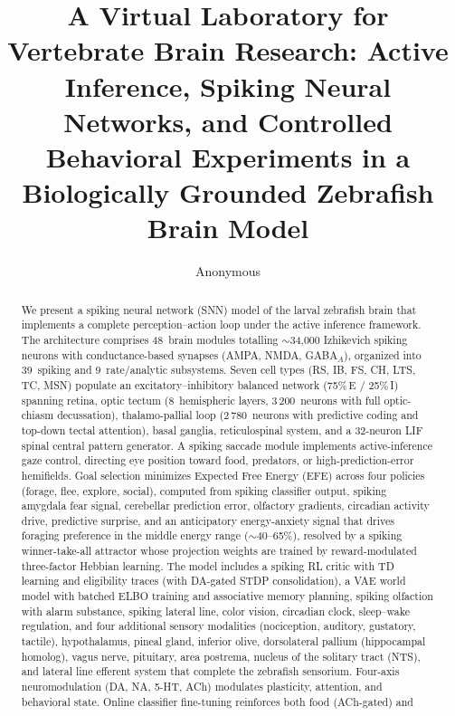\documentclass[12pt]{article}
\title{A Virtual Laboratory for Vertebrate Brain Research: Active Inference,
Spiking Neural Networks, and Controlled Behavioral Experiments in a
Biologically Grounded Zebrafish Brain Model}
\author{Anonymous}
\date{}
\begin{document}
\maketitle

\begin{abstract}
We present a spiking neural network (SNN) model of the larval zebrafish
brain that implements a complete perception--action loop under the
active inference framework.
The architecture comprises 48~brain modules totalling $\sim$34,000 Izhikevich
spiking neurons with conductance-based synapses (AMPA, NMDA, GABA$_A$),
organized into 39~spiking and 9~rate/analytic subsystems.
Seven cell types (RS, IB, FS, CH, LTS, TC, MSN) populate an
excitatory--inhibitory balanced network (75\%\,E / 25\%\,I) spanning
retina, optic tectum (8~hemispheric layers, 3\,200~neurons with full
optic-chiasm decussation), thalamo-pallial loop
(2\,780~neurons with predictive coding and top-down tectal attention),
basal ganglia, reticulospinal system, and a 32-neuron LIF spinal central
pattern generator.
A spiking saccade module implements active-inference gaze control,
directing eye position toward food, predators, or high-prediction-error
hemifields.
Goal selection minimizes Expected Free Energy (EFE) across four
policies (forage, flee, explore, social), computed from spiking
classifier output, spiking amygdala fear signal, cerebellar prediction
error, olfactory gradients, circadian activity drive, predictive
surprise, and an anticipatory energy-anxiety signal that drives
foraging preference in the middle energy range ($\sim$40--65\%),
resolved by a spiking winner-take-all attractor whose
projection weights are trained by reward-modulated three-factor
Hebbian learning.
The model includes a spiking RL critic with TD learning and
eligibility traces (with DA-gated STDP consolidation), a VAE world
model with batched ELBO training and associative memory planning,
spiking olfaction with alarm substance, spiking lateral line, color
vision, circadian clock, sleep--wake regulation, and four additional
sensory modalities (nociception, auditory, gustatory, tactile),
hypothalamus, pineal gland, inferior olive, dorsolateral pallium
(hippocampal homolog), vagus nerve, pituitary, area postrema,
nucleus of the solitary tract (NTS), and lateral line efferent
system that complete the zebrafish sensorium.
Four-axis neuromodulation (DA, NA, 5-HT, ACh) modulates plasticity,
attention, and behavioral state.
Online classifier fine-tuning reinforces both food (ACh-gated) and

\end{abstract}
\end{document}
